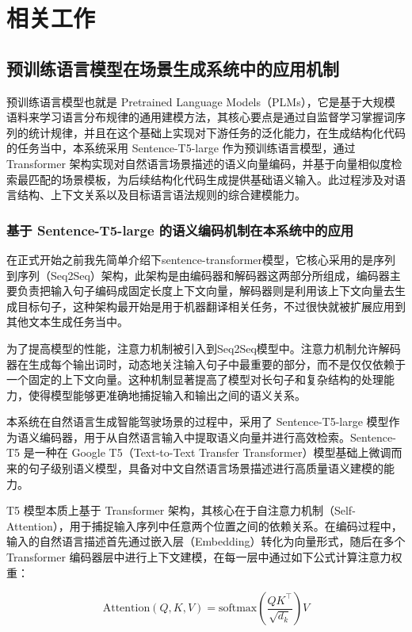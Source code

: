 \chapter{相关工作}

\section{预训练语言模型在场景生成系统中的应用机制}

预训练语言模型也就是 Pretrained Language Models（PLMs），它是基于大规模语料来学习语言分布规律的通用建模方法，其核心要点是通过自监督学习掌握词序列的统计规律，并且在这个基础上实现对下游任务的泛化能力，在生成结构化代码的任务当中，本系统采用 Sentence-T5-large 作为预训练语言模型，通过 Transformer 架构实现对自然语言场景描述的语义向量编码，并基于向量相似度检索最匹配的场景模板，为后续结构化代码生成提供基础语义输入。此过程涉及对语言结构、上下文关系以及目标语言语法规则的综合建模能力。

\subsection{基于 Sentence-T5-large 的语义编码机制在本系统中的应用}

在正式开始之前我先简单介绍下sentence-transformer模型，它核心采用的是序列到序列（Seq2Seq）架构，此架构是由编码器和解码器这两部分所组成，编码器主要负责把输入句子编码成固定长度上下文向量，解码器则是利用该上下文向量去生成目标句子，这种架构最开始是用于机器翻译相关任务，不过很快就被扩展应用到其他文本生成任务当中。

为了提高模型的性能，注意力机制被引入到Seq2Seq模型中。注意力机制允许解码器在生成每个输出词时，动态地关注输入句子中最重要的部分，而不是仅仅依赖于一个固定的上下文向量。这种机制显著提高了模型对长句子和复杂结构的处理能力，使得模型能够更准确地捕捉输入和输出之间的语义关系。

本系统在自然语言生成智能驾驶场景的过程中，采用了 Sentence-T5-large 模型作为语义编码器，用于从自然语言输入中提取语义向量并进行高效检索。Sentence-T5 是一种在 Google T5（Text-to-Text Transfer Transformer）模型基础上微调而来的句子级别语义模型，具备对中文自然语言场景描述进行高质量语义建模的能力。

T5 模型本质上基于 Transformer 架构，其核心在于自注意力机制（Self-Attention），用于捕捉输入序列中任意两个位置之间的依赖关系。在编码过程中，输入的自然语言描述首先通过嵌入层（Embedding）转化为向量形式，随后在多个 Transformer 编码器层中进行上下文建模，在每一层中通过如下公式计算注意力权重：

\begin{equation}
	\text{Attention}(Q, K, V) = \text{softmax}\left( \frac{QK^\top}{\sqrt{d_k}} \right)V
\end{equation}

